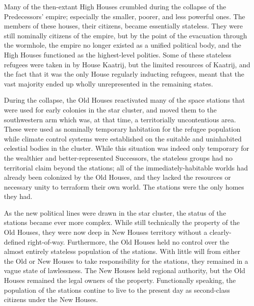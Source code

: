 \documentclass[11pt]{report}
\begin{document}
    Many of the then-extant High Houses crumbled during the collapse of the Predecessors' empire; especially the smaller, poorer, and less powerful ones. The members of these houses, their citizens, became essentially stateless. They were still nominally citizens of the empire, but by the point of the evacuation through the wormhole, the empire no longer existed as a unified political body, and the High Houses functioned as the highest-level polities. Some of these stateless refugees were taken in by House Kaatrij, but the limited resources of Kaatrij, and the fact that it was the only House regularly inducting refugees, meant that the vast majority ended up wholly unrepresented in the remaining states.

    During the collapse, the Old Houses reactivated many of the space stations that were used for early colonies in the star cluster, and moved them to the southwestern arm which was, at that time, a territorially uncontentious area. These were used as nominally temporary habitation for the refugee population while climate control systems were established on the suitable and uninhabited celestial bodies in the cluster. While this situation was indeed only temporary for the wealthier and better-represented Successors, the stateless groups had no territorial claim beyond the stations; all of the immediately-habitable worlds had already been colonized by the Old Houses, and they lacked the resources or necessary unity to terraform their own world. The stations were the only homes they had.

    As the new political lines were drawn in the star cluster, the status of the stations became ever more complex. While still technically the property of the Old Houses, they were now deep in New Houses territory without a clearly-defined right-of-way. Furthermore, the Old Houses held no control over the almost entirely stateless population of the stations. With little will from either the Old or New Houses to take responsibility for the stations, they remained in a vague state of lawlessness. The New Houses held regional authority, but the Old Houses remained the legal owners of the property. Functionally speaking, the population of the stations contine to live to the present day as second-class citizens under the New Houses.
\end{document}
